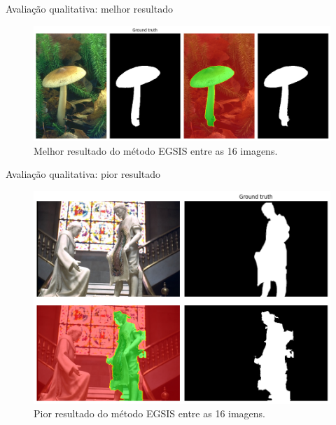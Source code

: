 \documentclass{templatebeamerufc/libs/ufc_format}
\begin{document}
\begin{frame}{Avaliação qualitativa: melhor resultado}
  \begin{figure}\label{fig:egsis-melhor}
    \centering
    \caption{Melhor resultado do método EGSIS entre as 16 imagens.}
    \includegraphics[scale=0.35]{figuras/egsis-melhor}
  \end{figure}
\end{frame}

\begin{frame}{Avaliação qualitativa: pior resultado}
  \begin{figure}\label{fig:egsis-pior}
    \centering
    \caption{Pior resultado do método EGSIS entre as 16 imagens.}
    \includegraphics[scale=0.36]{figuras/egsis-pior}
  \end{figure}
\end{frame}
\end{document}
